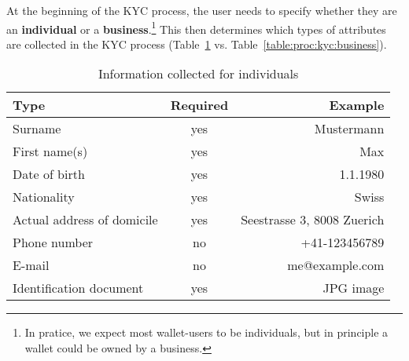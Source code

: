 At the beginning of the KYC process, the user needs to specify whether they
are an {\bf individual} or a {\bf business}.\footnote{ In pratice, we expect
most wallet-users to be individuals, but in principle a wallet could be owned
by a business.}  This then determines which types of attributes are collected
in the KYC process (Table~\ref{table:proc:kyc:individual} vs.
Table~\ref{table:proc:kyc:business}).

\begin{table}
  \caption{Information collected for individuals}
  \label{table:proc:kyc:individual}
  \begin{center}
    \begin{tabular}{l|c|r}
      {\bf Type}                 & {\bf Required}    & {\bf Example} \\ \hline \hline
      Surname                    & yes        & Mustermann \\
      First name(s)              & yes        & Max \\
      Date of birth              & yes        & 1.1.1980 \\
      Nationality                & yes        & Swiss \\
      Actual address of domicile & yes        & Seestrasse 3, 8008 Zuerich \\
      Phone number               & no         & +41-123456789 \\
      E-mail                     & no         & me@example.com \\
      Identification document    & yes        & JPG image \\
  \end{tabular}
  \end{center}
\end{table}

